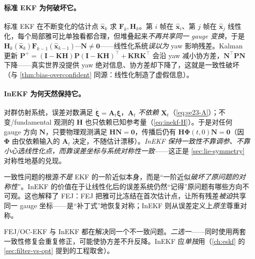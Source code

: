 \paragraph{标准 EKF 为何破坏它。}标准 EKF 在不断变化的估计点 $\hat{\mathbf{x}}_k$ 求 $\mathbf{F}_k,\mathbf{H}_k$。第 $i$ 帧在 $\hat{\mathbf{x}}_i$、第 $j$ 帧在 $\hat{\mathbf{x}}_j$ 线性化，每个局部雅可比单独看都合理，但堆叠起来\emph{不再共享同一 gauge 变换}，于是 $\mathbf{H}_k(\hat{\mathbf{x}}_k)\mathbf{F}_{k-1}(\hat{\mathbf{x}}_{k-1})\cdots\mathbf{N}\neq\mathbf{0}$——线性化系统\emph{误以为} yaw 影响残差。Kalman 更新 $\mathbf{P}^+=(\mathbf{I}-\mathbf{K}\mathbf{H})\mathbf{P}(\mathbf{I}-\mathbf{K}\mathbf{H})^\top+\mathbf{K}\mathbf{R}\mathbf{K}^\top$ 会沿 yaw 减小协方差，$\mathbf{N}^\top\mathbf{P}\mathbf{N}$ 下降——真实世界没提供 yaw 绝对信息、协方差却下降了，这就是一致性破坏（与 \cref{thm:bias-overconfident} 同源：线性化制造了虚假信息）。

\paragraph{InEKF 为何天然保持它。}对群仿射系统，误差对数满足 $\dot{\boldsymbol{\xi}}=\mathbf{A}_t\boldsymbol{\xi}$，$\mathbf{A}_t$ \emph{不依赖} $\hat{\mathbf{X}}_t$（\cref{eq:se23-A}）；不变/fundamental 观测的 $\mathbf{H}$ 也只依赖已知参考量（\cref{eq:inekf-H}）。于是对任何 gauge 方向 $\mathbf{N}$，只要物理观测满足 $\mathbf{H}\mathbf{N}=\mathbf{0}$，传播后仍有 $\mathbf{H}\boldsymbol{\Phi}(t,0)\mathbf{N}=\mathbf{0}$（因 $\boldsymbol{\Phi}$ 由仅依赖输入的 $\mathbf{A}_t$ 决定，不随估计漂移）。\emph{InEKF 保持一致性不靠调参、不靠小心选线性化点，而靠误差坐标与系统对称性一致}\cite{barrau2017invariant,hartley2020contact}——这正是 \cref{sec:lie-symmetry} 对称性地基的兑现。

\begin{insight}[一致性的真正根源]
一致性问题的根源\emph{不是} EKF 的一阶近似本身，而是“一阶近似\emph{破坏了原问题的对称性}”。InEKF 的价值在于让线性化后的误差系统仍然“记得”原问题有哪些方向不可观。这也解释了 FEJ：FEJ 把雅可比冻结在首次估计点，让所有残差\emph{被迫}共享同一 gauge 坐标——是“补丁式”地恢复对称；InEKF 则从误差定义上\emph{原生}尊重对称。
\end{insight}

\begin{pitfall}
FEJ/OC-EKF 与 InEKF 都在解决同一个不一致问题。\emph{二选一}——同时使用两套一致性修复会重复修正，可能使协方差不升反降。InEKF 应\emph{单独}用（\cref{ch:eskf} 的 \cref{sec:filter-vs-opt} 提到的工程取舍）。
\end{pitfall}

